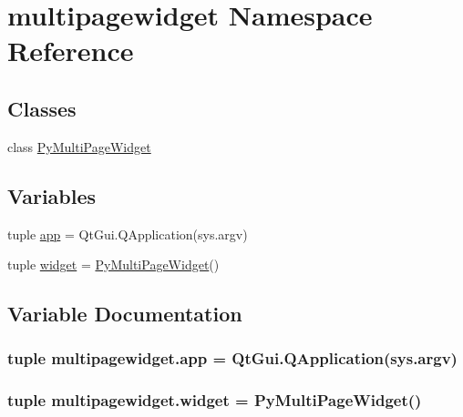 \hypertarget{namespacemultipagewidget}{}\section{multipagewidget Namespace Reference}
\label{namespacemultipagewidget}
\subsection*{Classes}
\begin{DoxyCompactItemize}
\item 
class \hyperlink{classmultipagewidget_1_1PyMultiPageWidget}{Py\+Multi\+Page\+Widget}
\end{DoxyCompactItemize}
\subsection*{Variables}
\begin{DoxyCompactItemize}
\item 
tuple \hyperlink{namespacemultipagewidget_adb0c7d608bd8754c6a0503c51f0d508e}{app} = Qt\+Gui.\+Q\+Application(sys.\+argv)
\item 
tuple \hyperlink{namespacemultipagewidget_a3edcfb7e9c2bca4c6cf9ecabda624aa5}{widget} = \hyperlink{classmultipagewidget_1_1PyMultiPageWidget}{Py\+Multi\+Page\+Widget}()
\end{DoxyCompactItemize}


\subsection{Variable Documentation}
\hypertarget{namespacemultipagewidget_adb0c7d608bd8754c6a0503c51f0d508e}{}
\subsubsection[{app}]{\setlength{\rightskip}{0pt plus 5cm}tuple multipagewidget.\+app = Qt\+Gui.\+Q\+Application(sys.\+argv)}\label{namespacemultipagewidget_adb0c7d608bd8754c6a0503c51f0d508e}
\hypertarget{namespacemultipagewidget_a3edcfb7e9c2bca4c6cf9ecabda624aa5}{}
\subsubsection[{widget}]{\setlength{\rightskip}{0pt plus 5cm}tuple multipagewidget.\+widget = {\bf Py\+Multi\+Page\+Widget}()}\label{namespacemultipagewidget_a3edcfb7e9c2bca4c6cf9ecabda624aa5}
